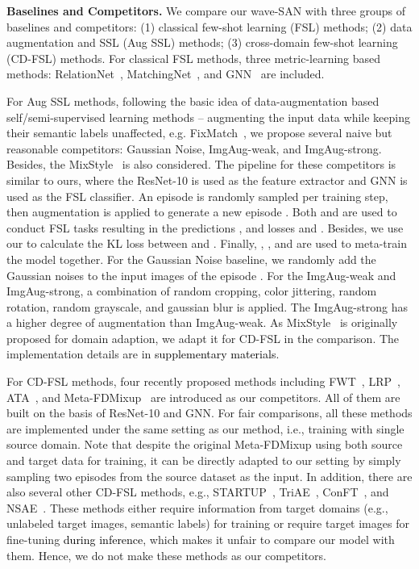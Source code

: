 \documentclass{article}
\newcommand{\fyq}{\textcolor{black}}
\begin{document}
\noindent\textbf{Baselines and Competitors.} 
We compare our wave-SAN with three groups of baselines and competitors: (1) classical few-shot learning (FSL) methods; (2) data augmentation and SSL (Aug  SSL) methods; (3) cross-domain few-shot learning (CD-FSL) methods. For classical FSL methods, three metric-learning based methods: RelationNet~\cite{sung2018learning}, MatchingNet~\cite{vinyals2016matching}, and GNN~\cite{garcia2017few} are included. 

For Aug  SSL methods, following the basic idea of data-augmentation based self/semi-supervised learning methods -- augmenting the input data while keeping their semantic labels unaffected, e.g. FixMatch~\cite{sohn2020fixmatch}, we propose several naive but reasonable competitors: Gaussian Noise, ImgAug-weak, and ImgAug-strong. Besides, the MixStyle~\cite{zhou2021domain} is also considered.
The pipeline for these competitors is similar to ours, where the ResNet-10 is used as the feature extractor and GNN is used as the FSL classifier. An episode  is randomly sampled per training step, then augmentation is applied to generate a new episode .  Both  and  are used to conduct FSL tasks resulting in the predictions ,  and losses  and .  Besides, we use our  to calculate the KL loss  between  and . Finally, , , and  are used to meta-train the model together. For the Gaussian Noise baseline, we randomly add the Gaussian noises to the input images of the episode . For the ImgAug-weak and ImgAug-strong, a combination of random cropping, color jittering, random rotation, random grayscale, and gaussian blur is applied. The ImgAug-strong has a higher degree of augmentation than ImgAug-weak. As MixStyle~\cite{zhou2021domain} is originally proposed for domain adaption, we adapt it for CD-FSL in the comparison. The implementation details are in \fyq{supplementary materials}.

For CD-FSL methods, four recently proposed methods including FWT~\cite{tseng2020cross}, LRP~\cite{sun2021explanation}, ATA~\cite{wang2021cross}, and Meta-FDMixup~\cite{fu2021meta} are introduced as our competitors. All of them are built on the basis of ResNet-10 and GNN. For fair comparisons, all these methods are implemented under the same setting as our method, i.e., training with single source domain. Note that despite the original Meta-FDMixup using both source and target data for training, it can be directly adapted to our setting by simply sampling two episodes from the source dataset as the input.
In addition, there are also several other CD-FSL methods, e.g., STARTUP~\cite{phoo2020self}, TriAE~\cite{guan2020large}, ConFT~\cite{das2021importance}, and NSAE~\cite{liang2021boosting}. These methods either require information from target domains (e.g., unlabeled target images, semantic labels) for training or require target images for fine-tuning \fyq{during inference}, which makes it unfair to compare our model with them. Hence, we do not make these methods as our competitors. 
\end{document}
